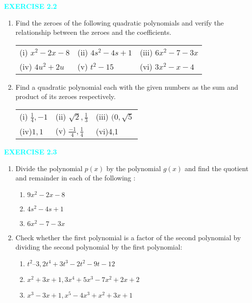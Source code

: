 \documentclass{article} %
\begin{document}
\vspace*{2em}
\begin{center}
\textbf{\textcolor{cyan}{EXERCISE 2.2}}
\end{center}

\begin{enumerate}
\item Find the zeroes of the following quadratic polynomials and verify the relationship between the
zeroes and the coefficients.\\

\begin{tabular}{lll}
  (i) $x^2 - 2x-8$ & (ii) $4s^2 -4s + 1$         & (iii)     $6x^2 -7 -3x$         \\
  (iv)          $4u^2 + 2u$     & (v)    $t^2 - 15$          & (vi)    $3x^2 - x -4$          \\
\end{tabular}

\item Find a quadratic polynomial each with the given numbers as the sum and product of its zeroes
respectively.\\
\begin{tabular}{lll}
 (i) $\frac{1}{4},-1$ & (ii) $\sqrt{2},\frac{1}{3}$ & (iii) $(0, \sqrt{5}$\\
(iv)$1,1$ &  (v) $\frac{-1}{4},\frac{1}{4}$  &  (vi)4,1 
\\

\end{tabular}
\end{enumerate}

\begin{center}
\textbf{\textcolor{cyan}{EXERCISE 2.3}}
\end{center}
\begin{enumerate}
\item Divide the polynomial $p(x)$ by the polynomial $g(x)$ and find the quotient and remainder 
in each of the following :
\begin{enumerate}[label=(\roman*).]
 \item  $9x^2 - 2x-8$
 \item $4s^2 -4s + 1$
 \item  $6x^2 -7 -3x$
\end{enumerate}
\item Check whether the first polynomial is a factor of the second polynomial by dividing the 
second polynomial by the first polynomial:	
\begin{enumerate}[label=(\roman*).]
 \item $ t^2 – 3, 2t^4 + 3t^3 - 2t^2 - 9t - 12 $
 \item $ x^2 + 3x + 1, 3x^4 + 5x^3 - 7x^2 + 2x + 2 $
 \item $ x^3 - 3x + 1, x^5 - 4x^3 + x^2 + 3x + 1 $
\end{enumerate}
\end{enumerate}
\end{document}
